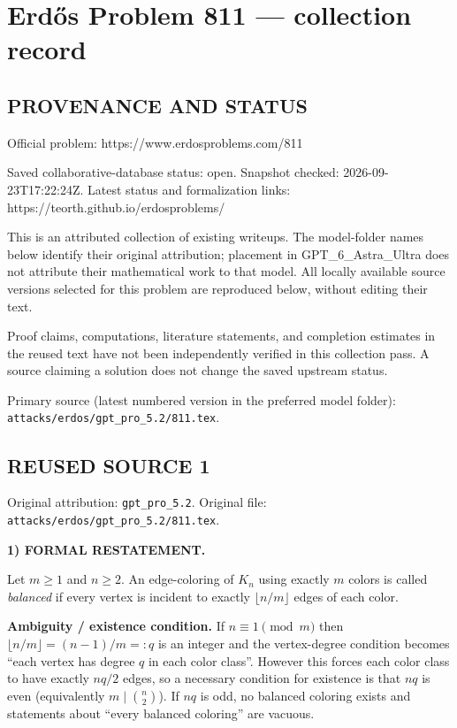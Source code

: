\section*{Erd\H{o}s Problem 811 --- collection record}

\subsection*{PROVENANCE AND STATUS}
Official problem: https://www.erdosproblems.com/811

Saved collaborative-database status: open.
Snapshot checked: 2026-09-23T17:22:24Z.
Latest status and formalization links: https://teorth.github.io/erdosproblems/

This is an attributed collection of existing writeups. The model-folder names below identify their original attribution; placement in GPT\_6\_Astra\_Ultra does not attribute their mathematical work to that model. All locally available source versions selected for this problem are reproduced below, without editing their text.

Proof claims, computations, literature statements, and completion estimates in the reused text have not been independently verified in this collection pass. A source claiming a solution does not change the saved upstream status.

Primary source (latest numbered version in the preferred model folder): \texttt{attacks/erdos/gpt\_pro\_5.2/811.tex}.

\subsection*{REUSED SOURCE 1}
Original attribution: \texttt{gpt\_pro\_5.2}.
Original file: \texttt{attacks/erdos/gpt\_pro\_5.2/811.tex}.


\noindent\textbf{1) FORMAL RESTATEMENT.}

Let $m\ge 1$ and $n\ge 2$.
An edge-coloring of $K_n$ using exactly $m$ colors is called \emph{balanced} if every vertex is incident to exactly $\lfloor n/m\rfloor$ edges of each color.

\textbf{Ambiguity / existence condition.} If $n\equiv 1\pmod m$ then $\lfloor n/m\rfloor=(n-1)/m=:q$ is an integer and the vertex-degree condition becomes ``each vertex has degree $q$ in each color class''. However this forces each color class to have exactly $nq/2$ edges, so a necessary condition for existence is that $nq$ is even (equivalently $m\mid \binom{n}{2}$). If $nq$ is odd, no balanced coloring exists and statements about ``every balanced coloring'' are vacuous.

